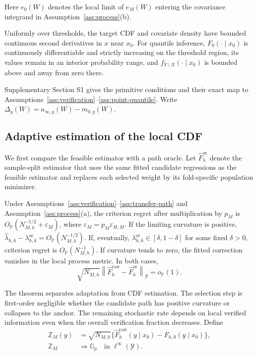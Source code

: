 Here \(e_0(W)\) denotes the local limit of \(e_M(W)\) entering the covariance
integrand in Assumption~\ref{ass:process}(b).

\begin{highlevelassumption}
\label{ass:point-quantile}
Uniformly over thresholds, the target CDF and covariate density have bounded
continuous second derivatives in \(x\) near \(x_0\). For quantile inference,
\(F_0(\cdot\mid x_0)\) is continuously differentiable and strictly increasing
on the threshold region, its values remain in an interior probability range,
and \(f_{Y\mid X}(\cdot\mid x_0)\) is bounded above and away from zero there.
\end{highlevelassumption}

Supplementary Section S1 gives the primitive conditions and their exact map to
Assumptions~\ref{ass:verification}--\ref{ass:point-quantile}. Write
\(\Delta_y(W)=a_{\infty,y}(W)-m_{0,y}(W)\).

\subsection{Adaptive estimation of the local CDF}

We first compare the feasible estimator with a path oracle. Let
\(\widehat F_h^{\mathrm{or}}\) denote the sample-split estimator that uses the
same fitted candidate regressions as the feasible estimator and replaces each
selected weight by its fold-specific population minimizer.

\begin{theorem}
\label{thm:oracle-equivalence}
Under Assumptions~\ref{ass:verification}--\ref{ass:transfer-path} and
Assumption~\ref{ass:process}(a), the criterion regret after multiplication by
\(p_M\) is \(O_{\mathbb P}(N_{M,h}^{-1/2}+\varepsilon_M)\), where
\(\varepsilon_M=p_M\varepsilon_{H,M}\). If the limiting curvature is positive,
\(\widehat\lambda_{h,k}-\lambda_{h,k}^{\mathrm{or}}=
O_{\mathbb P}(N_{M,h}^{-1/2})\). If, eventually,
\(\lambda_{h,k}^{\mathrm{or}}\in[\delta,1-\delta]\) for some fixed
\(\delta>0\), criterion regret is \(O_{\mathbb P}(N_{M,h}^{-1})\). If
curvature tends to zero, the
fitted correction vanishes in the local process metric. In both cases,
\[
\sqrt{N_{M,h}}
\left\|
\widehat F_h^{\mathrm{raw}}-\widehat F_h^{\mathrm{or}}
\right\|_{\mathcal Y}
=o_{\mathbb P}(1).
\]
\end{theorem}

The theorem separates adaptation from CDF estimation. The selection step is
first-order negligible whether the candidate path has positive curvature or
collapses to the anchor. The remaining stochastic rate depends on local
verified information even when the overall verification fraction decreases.
Define
\begin{align}
\mathbb Z_M(y)
&=
\sqrt{N_{M,h}}
\{\widehat F_h^{\mathrm{raw}}(y\mid x_0)-F_{h,0}(y\mid x_0)\},
\label{eq:scaled-cdf-process}\\
\mathbb Z_M
&\Rightarrow
\mathbb G_p
\quad\text{in }\ell^\infty(\mathcal Y).
\label{eq:process-limit}
\end{align}

